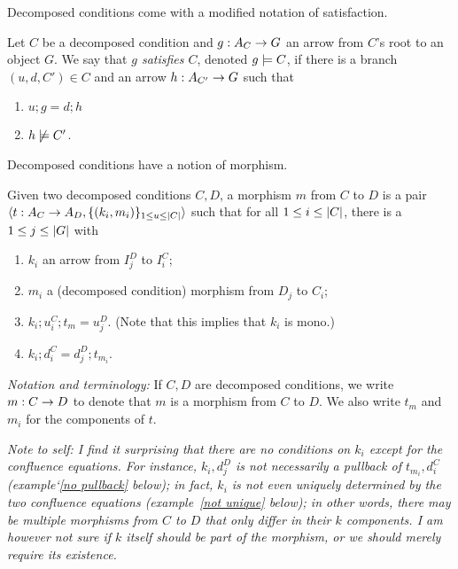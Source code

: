 \medskip\noindent Decomposed conditions come with a modified notation of satisfaction.

\begin{definition}
  Let $C$ be a decomposed condition and $g:A_C\rightarrow G$ an arrow from $C$'s root to an object $G$. We say that \emph{$g$ satisfies $C$}, denoted $g\models C$, if there is a branch $(u,d,C')\in C$ and an arrow $h:A_{C'}\rightarrow G$ such that
  \begin{enumerate}
  \item $u;g=d;h$
  \item $h\not\models C'$.
  \end{enumerate}
\end{definition}
%
Decomposed conditions have a notion of morphism.

\begin{definition}
  Given two decomposed conditions $C,D$, a morphism $m$ from $C$ to $D$ is a pair $\langle{t:A_C\rightarrow A_D,\{{(k_i,m_i)}\}_{1\leq u\leq |{C}|}}\rangle$ such that for all $1\leq i\leq |{C}|$, there is a $1\leq j\leq |{G}|$ with
  \begin{enumerate}
  \item $k_i$ an arrow from $I_j^D$ to $I_i^C$;
  \item $m_i$ a (decomposed condition) morphism from $D_j$ to $C_i$;
  \item $k_i;u_i^C;t_m=u_j^D$. (Note that this implies that $k_i$ is mono.)
  \item $k_i;d_i^C=d_j^D;t_{m_i}$.
  \end{enumerate}
\end{definition}
%
\emph{Notation and terminology:} If $C,D$ are decomposed conditions, we write $m:C\rightarrow D$ to denote that $m$ is a morphism from $C$ to $D$. We also write $t_m$ and $m_i$ for the components of $t$.

\medskip\noindent
\emph{Note to self: I find it surprising that there are no conditions on $k_i$ except for the confluence equations. For instance, $k_i,d_j^D$ is \emph{not} necessarily a pullback of $t_{m_i},d_i^C$ (example`\ref{no pullback} below); in fact, $k_i$ is \emph{not even} uniquely determined by the two confluence equations (example~\ref{not unique} below); in other words, there may be multiple morphisms from $C$ to $D$ that only differ in their $k$ components. I am however not sure if $k$ itself should be part of the morphism, or we should merely require its existence.}


